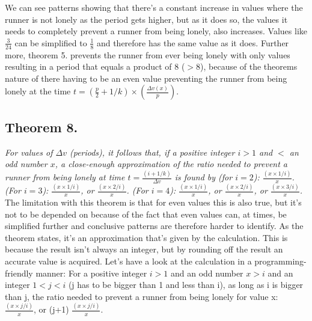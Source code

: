 \documentclass[12pt, a4paper]{article}
\begin{document}
\newline
\newline
We can see patterns showing that there's a constant increase in values where the runner is not lonely as the period gets higher, but as it does so, the values it needs to completely prevent a runner from being lonely, also increases. Values like $\frac{3}{24}$ can be simplified to $\frac{1}{8}$ and therefore has the same value as it does. \newline
Further more, theorem 5. prevents the runner from ever being lonely with only values resulting in a period that equals a product of $8$ ($>8$), because of the theorems nature of there having to be an even value preventing the runner from being lonely at the time $t = (\frac{p}{2}+1/k)\times (\frac{\Delta v(x)}{p})$.

\subsection*{Theorem 8.}\textit{For values of $\Delta v$ (periods), it follows that, if a positive integer $i>1$ and $<$ an odd number $x$, a close-enough approximation of the ratio needed to prevent a runner from being lonely at time $t= \frac{(i+1/k)}{\Delta v}$ is found by (for $i=2$): $\frac{(x\times 1/i)}{x}$. (For $i=3$): $\frac{(x\times 1/i)}{x}$, or $\frac{(x\times 2/i)}{x}$. (For $i=4$): $\frac{(x\times 1/i)}{x}$, or $\frac{(x\times 2/i)}{x}$, or $\frac{(x\times 3/i)}{x}$.}
\newline
\newline
The limitation with this theorem is that for even values this is also true, but it's not to be depended on because of the fact that even values can, at times, be simplified further and conclusive patterns are therefore harder to identify. As the theorem states, it's an approximation that's given by the calculation. This is because the result isn't always an integer, but by rounding off the result an accurate value is acquired.
\newline
\newline
Let's have a look at the calculation in a programming-friendly manner: \newline For a positive integer $i > 1$ and an odd number $x > i$ and an integer $1 < j < i$ (j has to be bigger than 1 and less than i), as long as i is bigger than j, the ratio needed to prevent a runner from being lonely for value x: $\frac{(x\times j/i)}{x}$, or (j+1) $\frac{(x\times j/i)}{x}$. 
\newline
\newline
\end{document}
